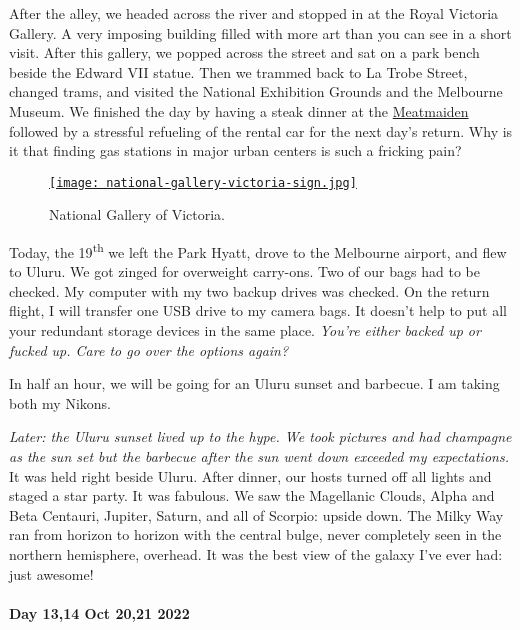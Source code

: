 After the alley, we headed across the river and stopped in at the Royal
Victoria Gallery. A very imposing building filled with more art than you
can see in a short visit. After this gallery, we popped across the
street and sat on a park bench beside the Edward VII statue. Then we
trammed back to La Trobe Street, changed trams, and visited the National
Exhibition Grounds and the Melbourne Museum. We finished the day by
having a steak dinner at the
\href{https://www.meatmaiden.com.au/}{Meatmaiden} followed by a
stressful refueling of the rental car for the next day's return. Why is
it that finding gas stations in major urban centers is such a fricking
pain?


\captionsetup[figure]{labelformat=empty}
\begin{figure}[htbp]
\centering
\href{https://conceptcontrol.smugmug.com/Trips/Overseas/Australia-New-Zealand-2022/i-LRj5GB9/A}{\texttt{[image: national-gallery-victoria-sign.jpg]}}
 \caption{National Gallery of Victoria.}
\label{fig:7573x2}
\end{figure}

Today, the 19\textsuperscript{th} we left the Park Hyatt, drove to the
Melbourne airport, and flew to Uluru. We got zinged for overweight
carry-ons. Two of our bags had to be checked. My computer with my two
backup drives was checked. On the return flight, I will transfer one USB
drive to my camera bags. It doesn't help to put all your redundant
storage devices in the same place. \emph{You're either backed up or
fucked up. Care to go over the options again?}

In half an hour, we will be going for an Uluru sunset and barbecue. I am
taking both my Nikons.

\emph{Later: the Uluru sunset lived up to the hype. We took pictures and
had champagne as the sun set but the barbecue after the sun went down
exceeded my expectations.} It was held right beside Uluru. After dinner,
our hosts turned off all lights and staged a star party. It was fabulous.
We saw the Magellanic Clouds, Alpha and Beta Centauri, Jupiter, Saturn,
and all of Scorpio: upside down. The Milky Way ran from horizon to
horizon with the central bulge, never completely seen in the northern
hemisphere, overhead. It was the best view of the galaxy I've ever had:
just awesome!

\hypertarget{day-1314-oct-2021-2022}{%
\paragraph{\texorpdfstring{\textbf{Day 13,14 Oct 20,21 2022}}{Day 13,14 Oct 20,21 2022}}\label{day-1314-oct-2021-2022}}

